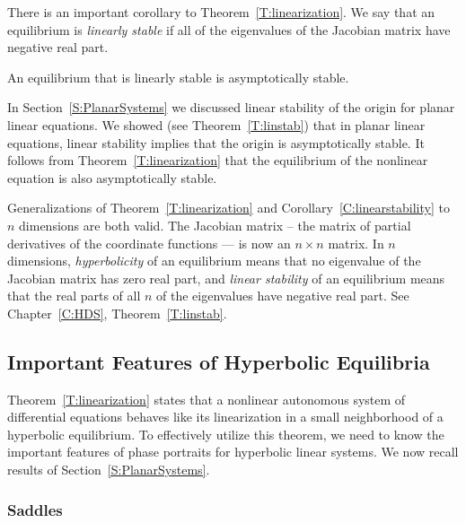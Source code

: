 \documentclass{ximera}
\begin{document}
There is an important corollary to Theorem~\ref{T:linearization}.
We say that an equilibrium is 
{\em linearly stable\/}
if all of the eigenvalues of the Jacobian matrix have negative real part.

\begin{corollary} \label{C:linearstability}
An equilibrium that is linearly stable is asymptotically stable.
\end{corollary}   

In Section~\ref{S:PlanarSystems} we discussed linear stability
of the origin for planar linear equations.  We showed (see
Theorem~\ref{T:linstab}) that in planar linear equations, linear
stability implies that the origin is asymptotically stable.  It
follows from Theorem~\ref{T:linearization} that the equilibrium
of the nonlinear equation is also asymptotically stable.  

\begin{remark} 
Generalizations of Theorem~\ref{T:linearization} and 
Corollary~\ref{C:linearstability} to $n$ dimensions are both valid. 
{\rm The Jacobian matrix -- the matrix of partial 
derivatives of the coordinate functions --- is now an $n\times n$
matrix.  In $n$ dimensions, {\em hyperbolicity\/} 
of an equilibrium means that no eigenvalue of the Jacobian matrix has 
zero real part, and {\em linear stability\/} of an equilibrium means 
that the real parts of all $n$ of the eigenvalues have negative real 
part.  See Chapter~\ref{C:HDS}, Theorem~\ref{T:linstab}.}
\end{remark}  

\subsection*{Important Features of Hyperbolic Equilibria}

Theorem~\ref{T:linearization} states that a nonlinear autonomous
system of differential equations behaves like its linearization 
in a small neighborhood of a hyperbolic equilibrium.  To effectively
utilize this theorem, we need to know the important features of phase 
portraits for hyperbolic linear systems.  We now recall results of 
Section~\ref{S:PlanarSystems}.

\subsubsection*{Saddles}  
\end{document}

